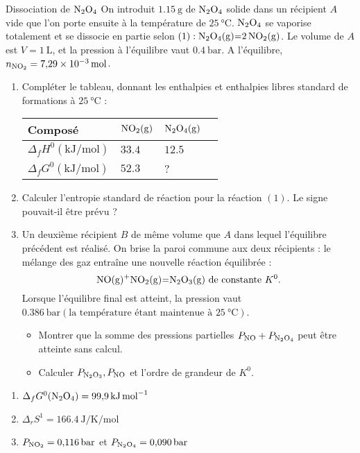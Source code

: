 \documentclass[french, a4paper, 11pt]{article}
\begin{document}
\begin{cadre}{Dissociation de \(\ce{N2O4}\)}
  On introduit \(\SI{1.15}{\gram}\) de \(\ce{N2O4}\) solide dans un récipient \(A\) vide que l'on porte ensuite à
  la température de \(\SI{25}{\celsius}\). \(\ce{N2O4}\) se vaporise totalement et se dissocie en partie selon \(\left(1\right) : \ce{N2O4(g)=2NO2(g)}\).
  Le volume de \(A\) est \(V=\SI{1}{\liter}\), et la pression à l'équilibre vaut \(\SI{0.4}{\bar}\). A l'équilibre, \(n_{\ce{NO2}}=\SI{7.29e-3}{\mole}\).
  \begin{enumerate}
    \item Compléter le tableau, donnant les enthalpies et enthalpies libres standard de formations à \(\SI{25}{\celsius}\) :
      \begin{tabular}{|l|l|l|l}
        \hline Composé & \(\ce{NO2(g)}\) & \(\ce{N2O4(g)}\) \\
        \hline \(\Delta_fH^0(\si{\kilo\joule\per\mole})\) & \(33.4\) & \(12.5\) \\
        \hline \(\Delta_fG^0(\si{\kilo\joule\per\mole})\) & \(52.3\) & ? \\
        \hline
      \end{tabular}
    \item Calculer l'entropie standard de réaction pour la réaction \(\left(1\right)\). Le signe pouvait-il être prévu ?
    \item Un deuxième récipient \(B\) de même volume que \(A\) dans lequel l'équilibre précédent est réalisé. On brise la paroi 
    commune aux deux récipients : le mélange des gaz entraîne une nouvelle réaction équilibrée :
      \[\ce{NO(g)+NO2(g)=N2O3(g)} \text{ de constante } K^0.\]
    Lorsque l'équilibre final est atteint, la pression vaut \(\SI{0.386}{\bar} \left( \text{la température étant maintenue à } \SI{25}{\celsius}\right)\).
      \begin{itemize}
        \item Montrer que la somme des pressions partielles \(P_{\ce{NO}}+P_{\ce{N2O4}}\) peut être atteinte sans calcul.
        \item Calculer \(P_{\ce{N2O3}},P_{\ce{NO}}\) et l'ordre de grandeur de \(K^0\).
      \end{itemize}
  \end{enumerate}

  \tcblower
  \begin{enumerate}
    \item \(\Delta_fG^0(\ce{N2O4})=\SI{99.9}{\kilo\joule\per\mole}\)
    \item \(\Delta_rS^1=\SI{166.4}{\joule\per\kelvin\per\mole}\)
    \item \(P_{\ce{NO2}}=\SI{0.116}{\bar}\) et \(P_{\ce{N2O4}}=\SI{0.090}{\bar}\)
  \end{enumerate}
\end{cadre}
\end{document}

